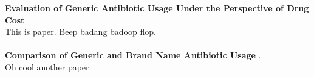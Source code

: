 



\let\counterwithout\relax
\let\counterwithin\relax
{}



\noindent\textbf{Evaluation of Generic Antibiotic Usage Under the Perspective of Drug Cost} \cite{mercanoglu_evaluation_2018}\\
This is paper. Beep badang badoop flop.\\
\\


\noindent\textbf{Comparison of Generic and Brand Name Antibiotic Usage} \cite{malhan_pin34_2008}.\\
Oh cool another paper.

\newpage

 


